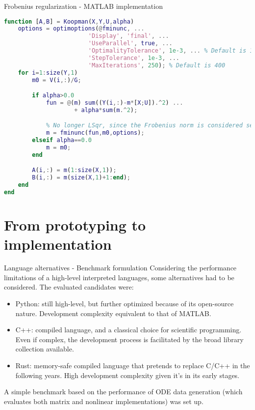 \documentclass{beamer}
\begin{document}
\begin{frame}[fragile]{Frobenius regularization - MATLAB implementation}
    \begin{lstlisting}[language=Matlab,basicstyle=\tiny]
function [A,B] = Koopman(X,Y,U,alpha)
    options = optimoptions(@fminunc, ...
                        'Display', 'final', ...
                        'UseParallel', true, ...
                        'OptimalityTolerance', 1e-3, ... % Default is 1e-6
                        'StepTolerance', 1e-3, ...
                        'MaxIterations', 250); % Default is 400
    for i=1:size(Y,1)
        m0 = V(i,:)/G;

        if alpha>0.0
            fun = @(m) sum((Y(i,:)-m*[X;U]).^2) ...
                    + alpha*sum(m.^2);

            % No longer LSqr, since the Frobenius norm is considered separately
            m = fminunc(fun,m0,options);
        elseif alpha==0.0
            m = m0;
        end

        A(i,:) = m(1:size(X,1));
        B(i,:) = m(size(X,1)+1:end);
    end
end
    \end{lstlisting}
\end{frame}


\section{From prototyping to implementation}

\begin{frame}{Language alternatives - Benchmark formulation}
    Considering the performance limitations of a high-level interpreted languages, some alternatives had to be considered. The evaluated candidates were:

    \begin{itemize}
        \item Python: still high-level, but further optimized because of its open-source nature. Development complexity equivalent to that of MATLAB.
        \item C++: compiled language, and a classical choice for scientific programming. Even if complex, the development process is facilitated by the broad library collection available.
        \item Rust: memory-safe compiled language that pretends to replace C/C++ in the following years. High development complexity given it's in its early stages.
    \end{itemize}

    A simple benchmark based on the performance of ODE data generation (which evaluates both matrix and nonlinear implementations) was set up.
\end{frame}
\end{document}
